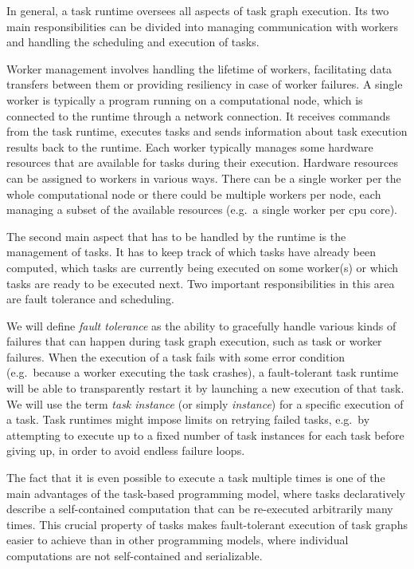 In general, a task runtime oversees all aspects of task graph execution. Its two main
responsibilities can be divided into managing communication with workers and handling the
scheduling and execution of tasks.

Worker management involves handling the lifetime of workers, facilitating data transfers between
them or providing resiliency in case of worker failures. A single worker is typically a program
running on a computational node, which is connected to the runtime through a network connection. It
receives commands from the task runtime, executes tasks and sends information about task execution
results back to the runtime. Each worker typically manages some hardware resources that are
available for tasks during their execution. Hardware resources can be assigned to workers in
various ways. There can be a single worker per the whole computational node or there could be
multiple workers per node, each managing a subset of the available resources (e.g.\ a single worker
per \gls{cpu} core).

The second main aspect that has to be handled by the runtime is the management of tasks. It has to
keep track of which tasks have already been computed, which tasks are currently being executed on
some worker(s) or which tasks are ready to be executed next. Two important responsibilities in this
area are fault tolerance and scheduling.

We will define \emph{fault tolerance} as the ability to gracefully handle various kinds of
failures that can happen during task graph execution, such as task or worker failures. When the
execution of a task fails with some error condition (e.g.\ because a worker executing the task
crashes), a fault-tolerant task runtime will be able to transparently restart it by launching a new
execution of that task. We will use the term \emph{task instance} (or simply \emph{instance}) for a specific execution of a
task. Task runtimes might impose limits on retrying failed tasks, e.g.\ by attempting to execute up
to a fixed number of task instances for each task before giving up, in order to avoid endless
failure loops.

The fact that it is even possible to execute a task multiple times is one of the main advantages of
the task-based programming model, where tasks declaratively describe a self-contained computation
that can be re-executed arbitrarily many times. This crucial property of tasks makes fault-tolerant
execution of task graphs easier to achieve than in other programming models, where individual
computations are not self-contained and serializable.

